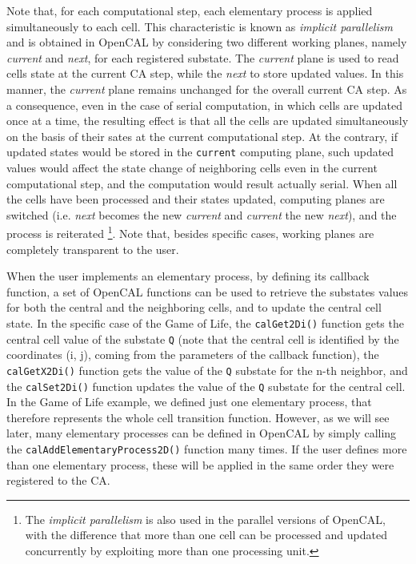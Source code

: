 Note that, for each computational step, each elementary process is
applied simultaneously to each cell. This characteristic is known as
\emph{implicit parallelism} and is obtained in OpenCAL by considering
two different working planes, namely \emph{current} and \emph{next},
for each registered substate. The \emph{current} plane is used to read
cells state at the current CA step, while the \emph{next} to store
updated values. In this manner, the \emph{current} plane remains
unchanged for the overall current CA step. As a consequence, even in
the case of serial computation, in which cells are updated once at a
time, the resulting effect is that all the cells are updated
simultaneously on the basis of their sates at the current
computational step. At the contrary, if updated states would be stored
in the \verb'current' computing plane, such updated values would
affect the state change of neighboring cells even in the current
computational step, and the computation would result actually
serial. When all the cells have been processed and their states
updated, computing planes are switched (i.e. \emph{next} becomes the
new \emph{current} and \emph{current} the new \emph{next}), and the
process is reiterated \footnote{The \emph{implicit parallelism} is
  also used in the parallel versions of OpenCAL, with the difference
  that more than one cell can be processed and updated concurrently by
  exploiting more than one processing unit.}. Note that, besides
specific cases, working planes are completely transparent to the user.

When the user implements an elementary process, by defining its
callback function, a set of OpenCAL functions can be used to retrieve
the substates values for both the central and the neighboring cells,
and to update the central cell state. In the specific case of the Game
of Life, the \verb'calGet2Di()' function gets the central cell value
of the substate \verb'Q' (note that the central cell is identified by
the coordinates (i, j), coming from the parameters of the callback
function), the \verb'calGetX2Di()' function gets the value of the
\verb'Q' substate for the n-th neighbor, and the \verb'calSet2Di()'
function updates the value of the \verb'Q' substate for the
central cell. In the Game of Life example, we defined just one
elementary process, that therefore represents the whole cell
transition function. However, as we will see later, many elementary
processes can be defined in OpenCAL by simply calling the
\verb'calAddElementaryProcess2D()' function many times. If the user
defines more than one elementary process, these will be applied in
the same order they were registered to the CA.

